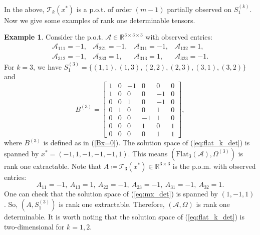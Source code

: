 \documentclass{amsart}
\newcommand{\re}{\mathbb{R}}
\newcommand{\reff}[1]{(\ref{#1})}
\newcommand{\mc}[1]{\mathcal{#1}}
\newcommand{\Flat}{\mbox{Flat}}
\newcommand{\baray}{\begin{array}}
\newcommand{\earay}{\end{array}}
\theoremstyle{definition}
\newtheorem{example}[theorem]{Example}
\numberwithin{equation}{section}
\begin{document}
In the above, $\mc{T}_k(x^*)$ is a p.o.t. of order $(m-1)$ partially observed on $S_1^{(k)}$.
Now we give some examples of rank one determinable tensors.


\begin{example}\cite{zhou25}
Consider the p.o.t. $\mc{A} \in \re^{3 \times 3 \times 3}$ with observed entries:
\[
\baray{llll}
\mc{A}_{111} = -1, &
\mc{A}_{221} = -1, & 
\mc{A}_{311} = -1, & 
\mc{A}_{132} = 1,  \\
\mc{A}_{312} = -1, & 
\mc{A}_{233} = 1, & 
\mc{A}_{313} = 1, & 
\mc{A}_{323} = -1.
\earay
\]
For $k = 3$, we have $S_1^{(3)} = \{ (1,1), (1,3), (2,2), (2,3), (3,1), (3,2) \}$ and
\[
B^{(3)} =
\left[
\begin{array}{rrrrrr}
1 & 0 & -1  & 0 & 0 & 0\\
1  & 0 & 0 & 0 & -1 & 0\\
0 & 0 & 1  & 0 & -1  & 0\\
0 & 1 & 0 & 0 & 1 & 0\\
0 & 0 & 0 & -1  & 1 & 0\\
0 & 0 & 0 & 1  & 0 & 1 \\
0 & 0 & 0 & 0 & 1 & 1 
\end{array}
\right],
\]
where $B^{(3)}$ is defined as in \reff{Bx=0}.
The solution space of \reff{eq:flat_k_det} is spanned by
$
x^* = (-1, 1, -1, -1, -1, 1).
$
This means $(\Flat_3(\mc{A}), \Omega^{(3)})$ is rank one extractable. 
Note that $A \coloneqq \mc{T}_3(x^*) \in \re^{3 \times 3}$ is the p.o.m. with observed entries:
\[
A_{11} = -1, \ A_{13} = 1, \ A_{22} = -1, \
A_{23} = -1, \ A_{31} = -1, \ A_{32} = 1.
\]
One can check that the solution space of \reff{eq:mx_det} is spanned by $(1, -1, 1)$.
So, $(A, S_1^{(3)})$ is rank one extractable.
Therefore, $(\mc{A}, \Omega)$ is rank one determinable.
It is worth noting that the solution space of \reff{eq:flat_k_det} is two-dimensional for $k=1,2$.
\end{example}
\end{document}
